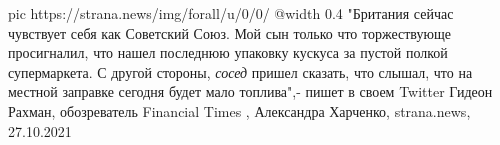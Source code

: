 \ifcmt
  pic https://strana.news/img/forall/u/0/0/%
  @width 0.4
\fi
"Британия сейчас чувствует себя как Советский Союз. Мой сын только что
торжествующе просигналил, что нашел последнюю упаковку кускуса за пустой полкой
супермаркета. С другой стороны, \emph{сосед} пришел сказать, что слышал, что на
местной заправке сегодня будет мало топлива",- пишет в своем Twitter Гидеон
Рахман, обозреватель Financial Times
, 
Александра Харченко, strana.news, 27.10.2021
